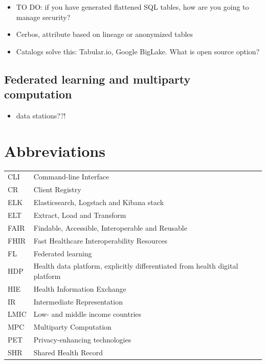 \documentclass[
  authoryear]{elsarticle}
\providecommand{\tightlist}{%
  \setlength{\itemsep}{0pt}\setlength{\parskip}{0pt}}\usepackage{longtable,booktabs,array}
\begin{document}
\begin{itemize}
\tightlist
\item
  TO DO: if you have generated flattened SQL tables, how are you going
  to manage security?
\item
  Cerbos, attribute based on lineage or anonymized tables
\item
  Catalogs solve this: Tabular.io, Google BigLake. What is open source
  option?
\end{itemize}

\subsection{Federated learning and multiparty
computation}\label{federated-learning-and-multiparty-computation}

\begin{itemize}
\tightlist
\item
  data stations??!
\end{itemize}

\section{Abbreviations}\label{abbreviations}

\begin{longtable}[]{@{}
  >{\raggedright\arraybackslash}p{}
  >{\raggedright\arraybackslash}p{}@{}}
\toprule\noalign{}
\endhead
\bottomrule\noalign{}
\endlastfoot
CLI & Command-line Interface \\
CR & Client Registry \\
ELK & Elasticsearch, Logstach and Kibana stack \\
ELT & Extract, Load and Transform \\
FAIR & Findable, Accessible, Interoperable and Reusable \\
FHIR & Fast Healthcare Interoperability Resources \\
FL & Federated learning \\
HDP & Health data platform, explicitly differentiated from health
digital platform \\
HIE & Health Information Exchange \\
IR & Intermediate Representation \\
LMIC & Low- and middle income countries \\
MPC & Multiparty Computation \\
PET & Privacy-enhancing technologies \\
SHR & Shared Health Record \\
\end{longtable}


  
\end{document}
